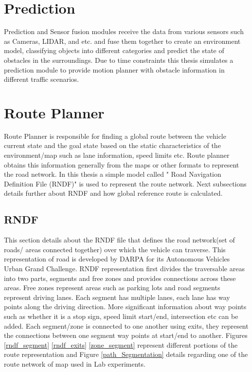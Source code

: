 \section{Prediction} \label{prediction}

Prediction and Sensor fusion modules receive the data from various sensors such as Cameras, LIDAR, and etc. and fuse them together to create an environment model, classifying objects into different categories and predict the state of obstacles in the surroundings. Due to time constraints this thesis simulates a prediction module to provide motion planner with obstacle information in different traffic scenarios.

\section{Route Planner} \label{route_planner}
Route Planner is responsible for finding a global route between the vehicle current state and the goal state based on the static characteristics of the environment/map such as lane information, speed limits etc. Route planner obtains this information generally from the maps or other formats to represent the road network. In this thesis a simple model called " Road Navigation Definition File (RNDF)"  \cite{rndf_darpa} \cite{rndf_fu} is used to represent the route network. Next subsections details further about RNDF and how global reference route is calculated.

\subsection{RNDF}

This section details about the RNDF file \cite{rndf_darpa} that defines the road network(set of roads/ areas connected together) over which the vehicle can traverse. This representation of road is developed by DARPA for its Autonomous Vehicles Urban Grand Challenge. RNDF representation first divides the traversable areas into two parts, segments and free zones and provides connections across these areas. Free zones represent areas such as parking lots and road segments represent driving lanes. Each segment has multiple lanes, each lane has way points along the driving direction. More significant information about way points such as whether it is a stop sign, speed limit start/end, intersection etc can be added. Each segment/zone is connected to one another using exits, they represent the connections between one segment way points at start/end to another. Figures \ref{rndf_segment} \ref{rndf_exits} \ref{zone_segment} \cite{rndf_darpa} represent different portions of the route representation and Figure \ref{path_Segmentation} details regarding one of the route network of map used in Lab experiments. 


